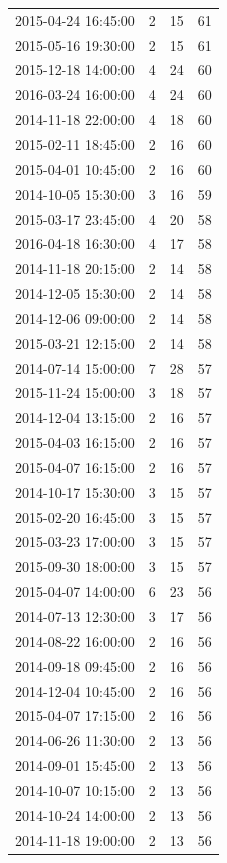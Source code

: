 \begin{tabular}{lrrr}
2015-04-24 16:45:00 & 2 & 15 & 61 \\
2015-05-16 19:30:00 & 2 & 15 & 61 \\
2015-12-18 14:00:00 & 4 & 24 & 60 \\
2016-03-24 16:00:00 & 4 & 24 & 60 \\
2014-11-18 22:00:00 & 4 & 18 & 60 \\
2015-02-11 18:45:00 & 2 & 16 & 60 \\
2015-04-01 10:45:00 & 2 & 16 & 60 \\
2014-10-05 15:30:00 & 3 & 16 & 59 \\
2015-03-17 23:45:00 & 4 & 20 & 58 \\
2016-04-18 16:30:00 & 4 & 17 & 58 \\
2014-11-18 20:15:00 & 2 & 14 & 58 \\
2014-12-05 15:30:00 & 2 & 14 & 58 \\
2014-12-06 09:00:00 & 2 & 14 & 58 \\
2015-03-21 12:15:00 & 2 & 14 & 58 \\
2014-07-14 15:00:00 & 7 & 28 & 57 \\
2015-11-24 15:00:00 & 3 & 18 & 57 \\
2014-12-04 13:15:00 & 2 & 16 & 57 \\
2015-04-03 16:15:00 & 2 & 16 & 57 \\
2015-04-07 16:15:00 & 2 & 16 & 57 \\
2014-10-17 15:30:00 & 3 & 15 & 57 \\
2015-02-20 16:45:00 & 3 & 15 & 57 \\
2015-03-23 17:00:00 & 3 & 15 & 57 \\
2015-09-30 18:00:00 & 3 & 15 & 57 \\
2015-04-07 14:00:00 & 6 & 23 & 56 \\
2014-07-13 12:30:00 & 3 & 17 & 56 \\
2014-08-22 16:00:00 & 2 & 16 & 56 \\
2014-09-18 09:45:00 & 2 & 16 & 56 \\
2014-12-04 10:45:00 & 2 & 16 & 56 \\
2015-04-07 17:15:00 & 2 & 16 & 56 \\
2014-06-26 11:30:00 & 2 & 13 & 56 \\
2014-09-01 15:45:00 & 2 & 13 & 56 \\
2014-10-07 10:15:00 & 2 & 13 & 56 \\
2014-10-24 14:00:00 & 2 & 13 & 56 \\
2014-11-18 19:00:00 & 2 & 13 & 56 \\

\end{tabular}
